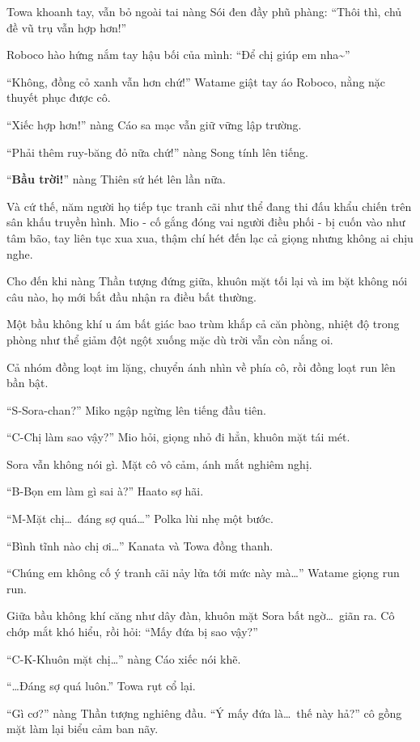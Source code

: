 \documentclass[../main.tex]{subfiles}
\begin{document}
Towa khoanh tay, vẫn bỏ ngoài tai nàng Sói đen đầy phũ phàng: ``Thôi thì, chủ đề vũ trụ vẫn hợp hơn!''

Roboco hào hứng nắm tay hậu bối của mình: ``Để chị giúp em nha\~{}''

``Không, đồng cỏ xanh vẫn hơn chứ!'' Watame giật tay áo Roboco, nằng nặc thuyết phục được cô.

``Xiếc hợp hơn!'' nàng Cáo sa mạc vẫn giữ vững lập trường.

``Phải thêm ruy-băng đỏ nữa chứ!'' nàng Song tính lên tiếng.

``\textbf{Bầu trời!}'' nàng Thiên sứ hét lên lần nữa.

Và cứ thế, năm người họ tiếp tục tranh cãi như thể đang thi đấu khẩu chiến trên sân khấu truyền hình. Mio - cố gắng đóng vai người điều phối - bị cuốn vào như tâm bão, tay liên tục xua xua, thậm chí hét đến lạc cả giọng nhưng không ai chịu nghe.

Cho đến khi nàng Thần tượng đứng giữa, khuôn mặt tối lại và im bặt không nói câu nào, họ mới bắt đầu nhận ra điều bất thường.

Một bầu không khí u ám bất giác bao trùm khắp cả căn phòng, nhiệt độ trong phòng như thể giảm đột ngột xuống mặc dù trời vẫn còn nắng oi.

Cả nhóm đồng loạt im lặng, chuyển ánh nhìn về phía cô, rồi đồng loạt run lên bần bật.

``S-Sora-chan?'' Miko ngập ngừng lên tiếng đầu tiên.

``C-Chị làm sao vậy?'' Mio hỏi, giọng nhỏ đi hẳn, khuôn mặt tái mét.

Sora vẫn không nói gì. Mặt cô vô cảm, ánh mắt nghiêm nghị.

``B-Bọn em làm gì sai à?'' Haato sợ hãi.

``M-Mặt chị\dots\ đáng sợ quá\dots'' Polka lùi nhẹ một bước.

``Bình tĩnh nào chị ơi\dots'' Kanata và Towa đồng thanh.

``Chúng em không cố ý tranh cãi nảy lửa tới mức này mà\dots'' Watame giọng run run.

Giữa bầu không khí căng như dây đàn, khuôn mặt Sora bất ngờ\dots\ giãn ra. Cô chớp mắt khó hiểu, rồi hỏi: ``Mấy đứa bị sao vậy?''

``C-K-Khuôn mặt chị\dots'' nàng Cáo xiếc nói khẽ.

``\dots Đáng sợ quá luôn.'' Towa rụt cổ lại.

``Gì cơ?'' nàng Thần tượng nghiêng đầu. ``Ý mấy đứa là\dots\ thế này hả?'' cô gồng mặt làm lại biểu cảm ban nãy.
\end{document}
